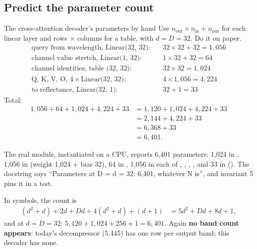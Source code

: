 \subsection{Predict the parameter count}

\begin{worked}[label={we:specdecoder:params}]{The cross-attention decoder's parameters by hand}
Use $n_{\text{out}}\times n_{\text{in}} + n_{\text{out}}$ for each linear layer and rows $\times$ columns for a table, with $d = D = 32$. Do it on paper.
\begin{align*}
  \text{query from wavelength, Linear(32, 32)}:&\quad 32\times32 + 32 = 1{,}056\\
  \text{channel value stretch, Linear(1, 32)}:&\quad 1\times32 + 32 = 64\\
  \text{channel identities, table (32, 32)}:&\quad 32\times32 = 1{,}024\\
  \text{Q, K, V, O, }4\times\text{Linear(32, 32)}:&\quad 4\times1{,}056 = 4{,}224\\
  \text{to reflectance, Linear(32, 1)}:&\quad 32 + 1 = 33
\end{align*}
Total:
\begin{align*}
  1{,}056 + 64 + 1{,}024 + 4{,}224 + 33 &= 1{,}120 + 1{,}024 + 4{,}224 + 33\\
  &= 2{,}144 + 4{,}224 + 33\\
  &= 6{,}368 + 33\\
  &= 6{,}401 .
\end{align*}
\end{worked}

{\sloppy The real module, instantiated on a CPU, reports 6,401 parameters\tagC{}: 1,024 in , 1,056 in  (weight 1,024 + bias 32), 64 in , 1,056 in each of , , , , and 33 in  (). The docstring says ``Parameters at D = d = 32: 6,401, whatever N is'', and  invariant 5 pins it in a test.\par}

In symbols, the count is
\begin{align}
  (d^2 + d) + 2d + Dd + 4(d^2 + d) + (d + 1) &= 5d^2 + Dd + 8d + 1, \label{eq:specdecoder:decparams}
\end{align}
and at $d = D = 32$: $5{,}120 + 1{,}024 + 256 + 1 = 6{,}401$. Again \textbf{no band count appears}: today's decompressor (5,445) has one row per output band; this decoder has none.

